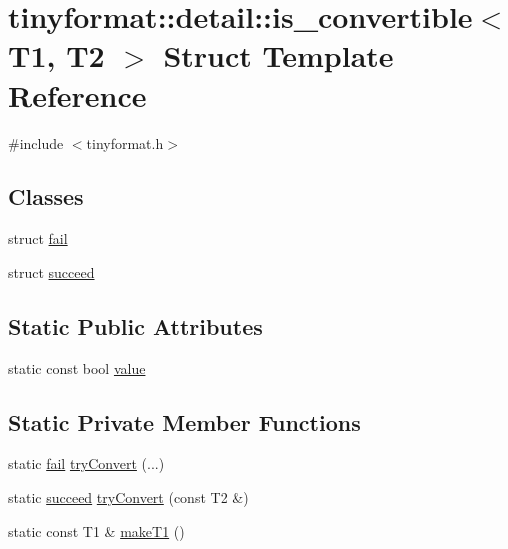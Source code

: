 \hypertarget{structtinyformat_1_1detail_1_1is__convertible}{}\section{tinyformat\+:\+:detail\+:\+:is\+\_\+convertible$<$ T1, T2 $>$ Struct Template Reference}
\label{structtinyformat_1_1detail_1_1is__convertible}


{\ttfamily \#include $<$tinyformat.\+h$>$}

\subsection*{Classes}
\begin{DoxyCompactItemize}
\item 
struct \mbox{\hyperlink{structtinyformat_1_1detail_1_1is__convertible_1_1fail}{fail}}
\item 
struct \mbox{\hyperlink{structtinyformat_1_1detail_1_1is__convertible_1_1succeed}{succeed}}
\end{DoxyCompactItemize}
\subsection*{Static Public Attributes}
\begin{DoxyCompactItemize}
\item 
static const bool \mbox{\hyperlink{structtinyformat_1_1detail_1_1is__convertible_a399ca4333bd68f88a5d5a2430f804df2}{value}}
\end{DoxyCompactItemize}
\subsection*{Static Private Member Functions}
\begin{DoxyCompactItemize}
\item 
static \mbox{\hyperlink{structtinyformat_1_1detail_1_1is__convertible_1_1fail}{fail}} \mbox{\hyperlink{structtinyformat_1_1detail_1_1is__convertible_a304a3fb17a674e61c688dd1219875870}{try\+Convert}} (...)
\item 
static \mbox{\hyperlink{structtinyformat_1_1detail_1_1is__convertible_1_1succeed}{succeed}} \mbox{\hyperlink{structtinyformat_1_1detail_1_1is__convertible_ad75043563f9d33d477ca134c7d48d942}{try\+Convert}} (const T2 \&)
\item 
static const T1 \& \mbox{\hyperlink{structtinyformat_1_1detail_1_1is__convertible_af2068cf5629a702c9ccb3b8136c6fe2e}{make\+T1}} ()
\end{DoxyCompactItemize}


